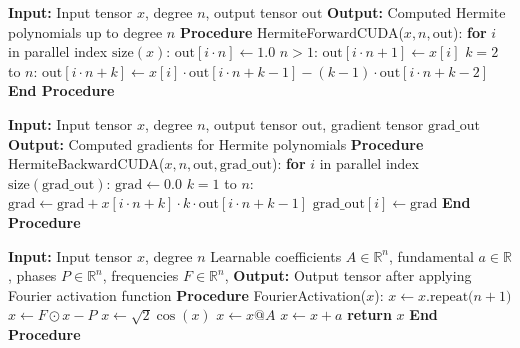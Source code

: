 \documentclass{article} %
\theoremstyle{plain}
\theoremstyle{definition}
\theoremstyle{remark}
\begin{document}
\begin{algorithm}[!htbp]
   \caption{Hermite Forward CUDA Kernel}
   \label{alg:hermite_cuda_forward}
   \begin{algorithmic}
      \STATE \textbf{Input:} Input tensor $x$, degree $n$, output tensor $\text{out}$
      \STATE \textbf{Output:} Computed Hermite polynomials up to degree $n$
      \STATE
      \STATE \textbf{Procedure} HermiteForwardCUDA($x, n, \text{out}$):
      \STATE \quad \textbf{for} $i$ in parallel index $\text{size}(x)$:
      \STATE \quad \quad $\text{out}[i \cdot n] \leftarrow 1.0$
      \STATE \quad \quad {} $n > 1$: $\text{out}[i \cdot n + 1] \leftarrow x[i]$
      \STATE \quad \quad {} $k = 2$ to $n$:
      \STATE \quad \quad \quad $\text{out}[i \cdot n + k] \leftarrow x[i] \cdot \text{out}[i \cdot n + k - 1] - (k - 1) \cdot \text{out}[i \cdot n + k - 2]$
      \STATE \textbf{End Procedure}
   \end{algorithmic}
\end{algorithm}
\begin{algorithm}[!htbp]
   \caption{Hermite Backward CUDA Kernel}
   \label{alg:hermite_cuda_backward}
   \begin{algorithmic}
      \STATE \textbf{Input:} Input tensor $x$, degree $n$, output tensor $\text{out}$, gradient tensor $\text{grad\_out}$
      \STATE \textbf{Output:} Computed gradients for Hermite polynomials
      \STATE
      \STATE \textbf{Procedure} HermiteBackwardCUDA($x, n, \text{out}, \text{grad\_out}$):
      \STATE \quad \textbf{for} $i$ in parallel index $\text{size}(\text{grad\_out})$:
      \STATE \quad \quad $\text{grad} \leftarrow 0.0$
      \STATE \quad \quad {} $k = 1$ to $n$:
      \STATE \quad \quad \quad $\text{grad} \leftarrow \text{grad} + x[i \cdot n + k] \cdot k \cdot \text{out}[i \cdot n + k - 1]$
      \STATE \quad \quad $\text{grad\_out}[i] \leftarrow \text{grad}$
      \STATE \textbf{End Procedure}
   \end{algorithmic}
\end{algorithm}
\begin{algorithm}[!htbp]
   \caption{Fourier Activation Function Forward Pass}
   \label{alg:fourier_forward}
   \begin{algorithmic}
      \STATE \textbf{Input:} Input tensor $x$, degree $n$
       Learnable coefficients $A \in \mathbb{R}^n$, fundamental $a \in \mathbb{R}$, phases $P \in \mathbb{R}^n$, frequencies $F \in \mathbb{R}^n$,      
      \STATE \textbf{Output:} Output tensor after applying Fourier activation function
      \STATE
      \STATE \textbf{Procedure} FourierActivation($x$):
      \STATE \quad $x \leftarrow x.\text{repeat($n+1$)}$
      \STATE \quad $x \leftarrow F \odot x - P$
      \STATE \quad $x \leftarrow \sqrt{2}\cos(x)$
      \STATE \quad $x \leftarrow x @ A$
      \STATE \quad $x \leftarrow x + a$
      \STATE \quad \textbf{return} $x$
      \STATE \textbf{End Procedure}
   \end{algorithmic}
\end{algorithm}
\end{document}

